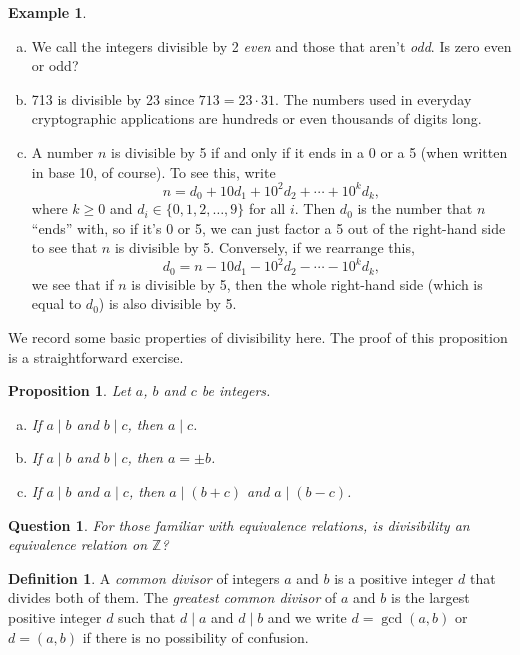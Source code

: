 \documentclass[12pt]{article}
\theoremstyle{plain}
\newtheorem{proposition}[theorem]{Proposition}
\newtheorem{question}[theorem]{Question}
\theoremstyle{definition}
\newtheorem{definition}[theorem]{Definition}
\newtheorem{example}[theorem]{Example}
\theoremstyle{remark}
\newcommand{\Z}{\mathbb{Z}}
\begin{document}
\begin{example}
    \begin{enumerate}[(a)]
        \item We call the integers divisible by 2 \emph{even} and those that aren't \emph{odd}. Is zero even or odd?

        \item 713 is divisible by 23 since $713 = 23\cdot 31$. The numbers used in everyday cryptographic applications are hundreds or even thousands of digits long.

        \item A number $n$ is divisible by 5 if and only if it ends in a 0 or a 5 (when written in base 10, of course). To see this, write
        \[
            n = d_0 + 10d_1 + 10^2d_2 + \cdots + 10^kd_k,
        \]
        where $k\geq 0$ and $d_i \in \{0, 1, 2, \ldots, 9\}$ for all $i$.
        Then $d_0$ is the number that $n$ ``ends'' with, so if it's 0 or 5, we can just factor a 5 out of the right-hand side to see that $n$ is divisible by 5.
        Conversely, if we rearrange this,
        \[
            d_0 = n - 10d_1 - 10^2d_2 - \cdots - 10^kd_k,
        \]
        we see that if $n$ is divisible by 5, then the whole right-hand side (which is equal to $d_0$) is also divisible by 5.
    \end{enumerate}
\end{example}

We record some basic properties of divisibility here. The proof of this proposition is a straightforward exercise.

\begin{proposition}
    Let $a$, $b$ and $c$ be integers.
    \begin{enumerate}[(a)]
        \item If $a\mid b$ and $b\mid c$, then $a\mid c$.
        \item If $a\mid b$ and $b\mid c$, then $a = \pm b$.
        \item If $a\mid b$ and $a\mid c$, then $a\mid (b+c)$ and $a\mid (b-c)$.
    \end{enumerate}
\end{proposition}

\begin{question}
    For those familiar with equivalence relations, is divisibility an equivalence relation on $\Z$?
\end{question}

\begin{definition}
    A \emph{common divisor} of integers $a$ and $b$ is a positive integer $d$ that divides both of them.
    The \emph{greatest common divisor} of $a$ and $b$ is the largest positive integer $d$ such that $d\mid a$ and $d\mid b$ and we write $d = \gcd(a,b)$ or $d = (a,b)$ if there is no possibility of confusion.
\end{definition}
\end{document}
